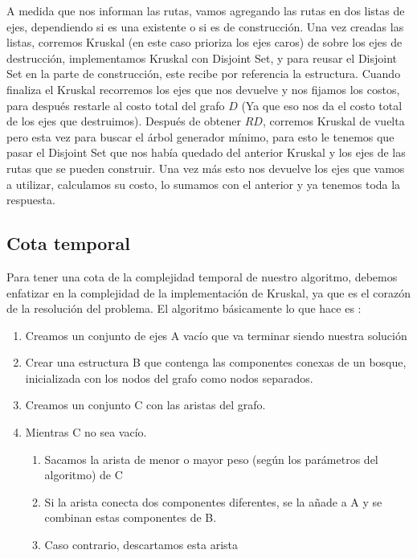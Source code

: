 A medida que nos informan las rutas, vamos agregando las rutas en dos listas de ejes, dependiendo si es una existente o si es de construcción. Una vez creadas las listas, corremos Kruskal (en este caso prioriza los ejes caros) de sobre los ejes de destrucción, implementamos Kruskal con Disjoint Set, y para reusar el Disjoint Set en la parte de construcción, este recibe por referencia la estructura. Cuando finaliza el Kruskal recorremos los ejes que nos devuelve y nos fijamos los costos, para después restarle al costo total del grafo $D$ (Ya que eso nos da el costo total de los ejes que destruimos). Después de obtener $RD$, corremos Kruskal de vuelta pero esta vez para buscar el árbol generador mínimo, para esto le tenemos que pasar el Disjoint Set que nos había quedado del anterior Kruskal  y los ejes de las rutas que se pueden construir. Una vez más esto nos devuelve los ejes que vamos a utilizar, calculamos su costo, lo sumamos con el anterior y ya tenemos toda la respuesta.

\subsection{Cota temporal}

Para tener una cota de la complejidad temporal de nuestro algoritmo, debemos enfatizar en la complejidad de la implementación de Kruskal, ya que es el corazón de la resolución del problema. El algoritmo básicamente lo que hace es :
\begin{enumerate}
	\item Creamos un conjunto de ejes A vacío que va terminar siendo nuestra solución
\item Crear una estructura B que contenga las componentes conexas de un bosque, inicializada con los nodos del grafo como nodos separados.
\item Creamos un conjunto C con las aristas del grafo.
\item Mientras C no sea vacío.
\begin{enumerate}
\item Sacamos la arista de menor o mayor peso (según los parámetros del algoritmo) de C
\item Si la arista conecta dos componentes diferentes, se la añade a A y se combinan estas componentes de B.
\item Caso contrario, descartamos esta arista
\end{enumerate}
\end{enumerate}
 
